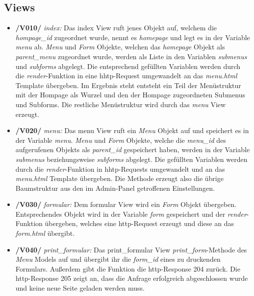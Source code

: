 \subsection{Views}
\begin{itemize}
    \item \textbf{/V010/} \textit{index:} Das index View ruft jenes Objekt auf, welchem die \textit{hompage\_id} zugeordnet wurde, nennt es \textit{homepage} und legt es in der Variable \textit{menu} ab. \textit{Menu} und \textit{Form} Objekte, welchen das \textit{homepage} Objekt als \textit{parent\_menu} zugeordnet wurde, werden als Liste in den Variablen \textit{submenus} und \textit{subforms} abgelegt. Die entsprechend gefüllten Variablen werden durch die \textit{render}-Funktion in eine hhtp-Request umgewandelt an das \textit{menu.html} Template übergeben. Im Ergebnis steht entsteht ein Teil der Menüstruktur mit der Hompage als Wurzel und den der Hompage zugeordneten Submenus und Subforms. Die restliche Menüstruktur wird durch das \textit{menu} View erzeugt.
    \item \textbf{/V020/} \textit{menu:} Das menu View ruft ein \textit{Menu} Objekt auf und speichert es in der Variable \textit{menu}. \textit{Menu} und \textit{Form} Objekte, welche die \textit{menu\_id} des aufgerufenen Objekts als \textit{parent\_id} gespeichert haben, werden in der Variable \textit{submenus} beziehungsweise \textit{subforms} abgelegt. Die gefüllten Variablen werden durch die \textit{render}-Funktion in hhtp-Requests umgewandelt und an das \textit{menu.html} Template übergeben. Die Methode erzeugt also die übrige Baumstruktur aus den im Admin-Panel getroffenen Einstellungen.
    \item \textbf{/V030/} \textit{formular:} Dem formular View wird ein \textit{Form} Objekt übergeben. Entsprechendes Objekt wird in der Variable \textit{form} gespeichert und der \textit{render}-Funktion übergeben, welches eine http-Request erzeugt und diese an das \textit{form.html} übergibt.
    \item \textbf{/V040/} \textit{print\_formular:} Das print\_formular View \textit{print\_form}-Methode des \textit{Menu} Models auf und übergibt ihr die \textit{form\_id} eines zu druckenden Formulars. Außerdem gibt die Funktion die http-Response 204 zurück. Die http-Response 205 zeigt an, dass die Anfrage erfolgreich abgeschlossen wurde und keine neue Seite geladen werden muss. 
\end{itemize}
\newpage 